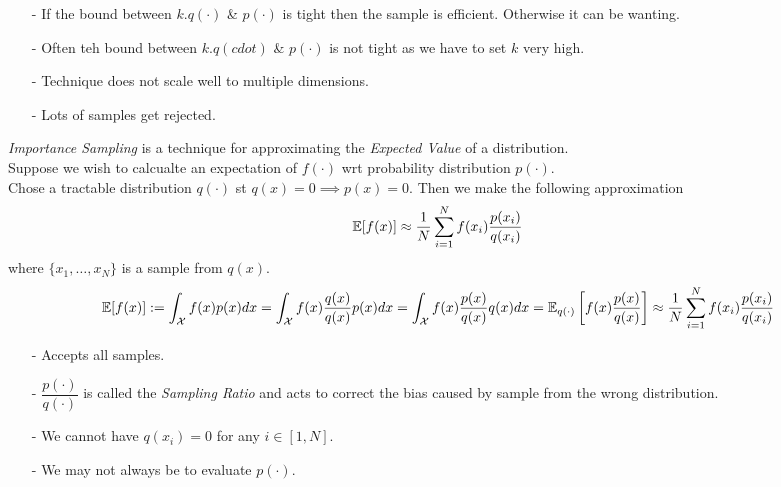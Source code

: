 \documentclass[11pt,a4paper]{article}
\begin{document}
\begin{itemize}
	\item[-] If the bound between $k.q(\cdot)$ \& $p(\cdot)$ is tight then the sample is efficient. Otherwise it can be wanting.
	\item[-] Often teh bound between $k.q(cdot)$ \& $p(\cdot)$ is not tight as we have to set $k$ very high.
	\item[-] Technique does not scale well to multiple dimensions.
	\item[-] Lots of samples get rejected.
\end{itemize}

\textit{Importance Sampling} is a technique for approximating the \textit{Expected Value} of a distribution.\\
Suppose we wish to calcualte an expectation of $f(\cdot)$ wrt probability distribution $p(\cdot)$.\\
Chose a tractable distribution $q(\cdot)$ st $q(x)=0\implies p(x)=0$. Then we make the following approximation
$$\displaystyle{\mathbb{E}[f(x)]\approx\frac{1}{N}\sum_{i=1}^Nf(x_i)\frac{p(x_i)}{q(x_i)}}$$
where $\{x_1,\dots,x_N\}$ is a sample from $q(x)$.\\

$$\displaystyle{\mathbb{E}[f(x)]:=\int_\mathcal{X} f(x)p(x)dx=\int_\mathcal{X} f(x)\frac{q(x)}{q(x)}p(x)dx=\int_\mathcal{X} f(x)\frac{p(x)}{q(x)}q(x)dx=\mathbb{E}_{q(\cdot)}\left[f(x)\frac{p(x)}{q(x)}\right]\approx\frac{1}{N}\sum_{i=1}^Nf(x_i)\frac{p(x_i)}{q(x_i)}}$$

\begin{itemize}
	\item[-] Accepts all samples.
	\item[-] $\dfrac{p(\cdot)}{q(\cdot)}$ is called the \textit{Sampling Ratio} and acts to correct the bias caused by sample from the wrong distribution.
	\item[-] We cannot have $q(x_i)=0$ for any $i\in[1,N]$.
	\item[-] We may not always be to evaluate $p(\cdot)$.
\end{itemize}
\end{document}

